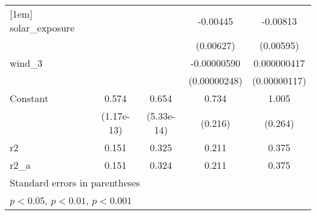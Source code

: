 {\begin{tabular}{l*{4}{c}}
[1em]
solar\_exposure      &                     &                     &    -0.00445         &    -0.00813         \\
                    &                     &                     &   (0.00627)         &   (0.00595)         \\
[1em]
wind\_3              &                     &                     & -0.00000590         & 0.000000417         \\
                    &                     &                     &(0.00000248)         &(0.00000117)         \\
[1em]
Constant            &       0.574\sym{***}&       0.654\sym{***}&       0.734\sym{*}  &       1.005\sym{*}  \\
                    &  (1.17e-13)         &  (5.33e-14)         &     (0.216)         &     (0.264)         \\
\hline
r2                  &       0.151         &       0.325         &       0.211         &       0.375         \\
r2\_a                &       0.151         &       0.324         &       0.211         &       0.375         \\
\hline\hline
\multicolumn{5}{l}{\footnotesize Standard errors in parentheses}\\
\multicolumn{5}{l}{\footnotesize \sym{*} \(p<0.05\), \sym{**} \(p<0.01\), \sym{***} \(p<0.001\)}\\
\end{tabular}
}

